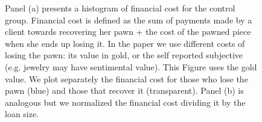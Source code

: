 \documentclass[oneside,11pt]{article}
\begin{document}
\begin{figure}[H]
         \scriptsize
         Panel (a) presents a histogram of financial cost for the control group. Financial cost is defined as the sum of payments made by a client towards recovering her pawn + the cost of the pawned piece when she ends up losing it. In the paper we use different costs of losing the pawn: its value in gold, or the self reported subjective (e.g. jewelry may have sentimental value). This Figure uses the gold value. We plot separately the financial cost for those who lose the pawn (blue) and those that recover it (transparent).  Panel (b) is analogous but we normalized the financial cost dividing it by the loan size.  %
\end{figure}
\end{document}
